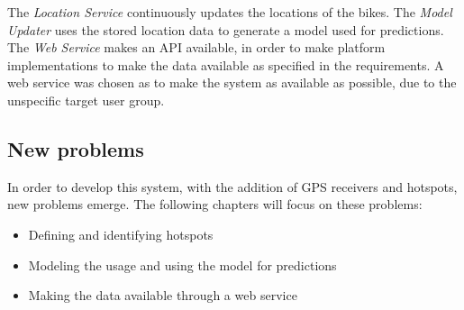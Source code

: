 The \textit{Location Service} continuously updates the locations of the bikes.
The \textit{Model Updater} uses the stored location data to generate a model used for predictions.
The \textit{Web Service} makes an API available, in order to make platform implementations to make the data available as specified in the requirements.
A web service was chosen as to make the system as available as possible, due to the unspecific target user group.

\subsection{New problems} \label{new_problems}
In order to develop this system, with the addition of GPS receivers and hotspots, new problems emerge.
The following chapters will focus on these problems:

\begin{itemize}
\item Defining and identifying hotspots
\item Modeling the usage and using the model for predictions
\item Making the data available through a web service
\end{itemize}
